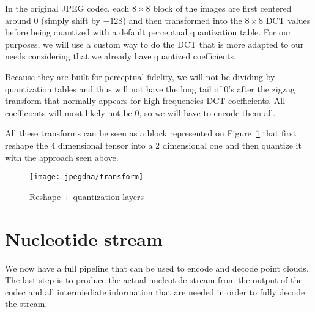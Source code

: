 In the original JPEG codec, each $8 \times 8$ block of the images are first centered around $0$ (simply shift by $-128$) and then transformed into the $8 \times 8$ DCT values before being quantized with a default perceptual quantization table. 
For our purposes, we will use a custom way to do the DCT that is more adapted to our needs considering that we already have quantized coefficients.

Because they are built for perceptual fidelity, we will not be dividing by quantization tables and thus will not have the long tail of $0$'s after the zigzag transform that normally appears for high frequencies DCT coefficients. All coefficients will most likely not be $0$, so we will have to encode them all.

All these transforms can be seen as a block represented on Figure~\ref{fig:reshape+quantization} that first reshape the $4$ dimensional tensor into a $2$ dimensional one and then quantize it with the approach seen above.

\begin{figure}[h]
    \centering
    \texttt{[image: jpegdna/transform]}
    \caption{Reshape + quantization layers}
    \label{fig:reshape+quantization}
\end{figure}

% 

\section{Nucleotide stream}

We now have a full pipeline that can be used to encode and decode point clouds. The last step is to produce the actual nucleotide stream from the output of the codec and all intermiediate information that are needed in order to fully decode the stream.

